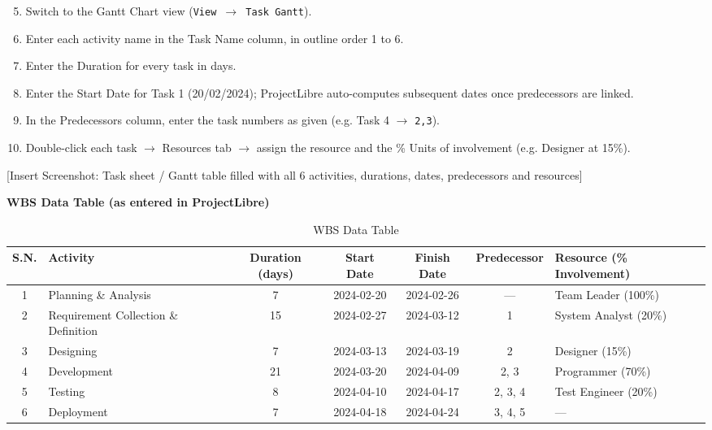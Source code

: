 \documentclass[10pt,a4paper]{article}
\begin{document}
\begin{enumerate}[nosep]
    \setcounter{enumi}{4}
    \item Switch to the Gantt Chart view (\texttt{View $\to$ Task Gantt}).
    \item Enter each activity name in the Task Name column, in outline order 1 to 6.
    \item Enter the Duration for every task in days.
    \item Enter the Start Date for Task 1 (20/02/2024); ProjectLibre auto-computes subsequent dates once predecessors are linked.
    \item In the Predecessors column, enter the task numbers as given (e.g. Task 4 $\to$ \texttt{2,3}).
    \item Double-click each task $\to$ Resources tab $\to$ assign the resource and the \% Units of involvement (e.g. Designer at 15\%).
\end{enumerate}

[Insert Screenshot: Task sheet / Gantt table filled with all 6 activities, durations, dates, predecessors and resources]

\vspace{0.2cm}
\noindent\textbf{WBS Data Table (as entered in ProjectLibre)}

\begin{table}[h!]
\centering
\renewcommand{\arraystretch}{1.15}
\begin{tabular}{|c|l|c|c|c|c|l|}
\hline
\textbf{S.N.} & \textbf{Activity} & \textbf{Duration (days)} & \textbf{Start Date} & \textbf{Finish Date} & \textbf{Predecessor} & \textbf{Resource (\% Involvement)} \\ \hline
1 & Planning \& Analysis & 7 & 2024-02-20 & 2024-02-26 & --- & Team Leader (100\%) \\ \hline
2 & Requirement Collection \& Definition & 15 & 2024-02-27 & 2024-03-12 & 1 & System Analyst (20\%) \\ \hline
3 & Designing & 7 & 2024-03-13 & 2024-03-19 & 2 & Designer (15\%) \\ \hline
4 & Development & 21 & 2024-03-20 & 2024-04-09 & 2, 3 & Programmer (70\%) \\ \hline
5 & Testing & 8 & 2024-04-10 & 2024-04-17 & 2, 3, 4 & Test Engineer (20\%) \\ \hline
6 & Deployment & 7 & 2024-04-18 & 2024-04-24 & 3, 4, 5 & --- \\ \hline
\end{tabular}
\caption*{WBS Data Table}
\end{table}
\end{document}
